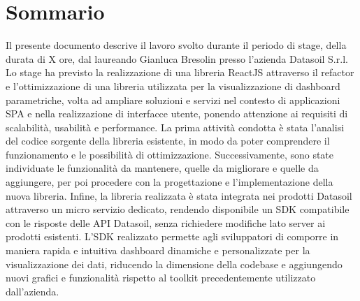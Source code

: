 \cleardoublepage
{}
{}
\begingroup
\let\clearpage\relax
\let\cleardoublepage\relax
\chapter*{Sommario}

Il presente documento descrive il lavoro svolto durante il periodo di stage, della durata di X ore, dal laureando Gianluca Bresolin
presso l'azienda Datasoil S.r.l. Lo stage ha previsto la realizzazione di una libreria ReactJS attraverso il refactor
e l'ottimizzazione di una libreria utilizzata per la visualizzazione di dashboard parametriche, volta ad ampliare soluzioni e servizi
nel contesto di applicazioni SPA e nella realizzazione di interfacce utente, ponendo attenzione ai requisiti di scalabilità,
usabilità e performance. \newline
La prima attività condotta è stata l'analisi del codice sorgente della libreria esistente, in modo da poter comprendere il funzionamento e le possibilità
di ottimizzazione. Successivamente, sono state individuate le funzionalità da mantenere, quelle da migliorare e quelle da aggiungere,
per poi procedere con la progettazione e l'implementazione della nuova libreria. \newline
Infine, la libreria realizzata è stata integrata nei prodotti Datasoil attraverso un micro servizio dedicato, rendendo disponibile un SDK
compatibile con le risposte delle API Datasoil, senza richiedere modifiche lato server ai prodotti esistenti. \newline
L'SDK realizzato permette agli sviluppatori di comporre in maniera rapida e intuitiva dashboard
dinamiche e personalizzate per la visualizzazione dei dati, riducendo la dimensione della codebase e aggiungendo nuovi grafici e funzionalità
rispetto al toolkit precedentemente utilizzato dall'azienda.


\endgroup
\vfill
